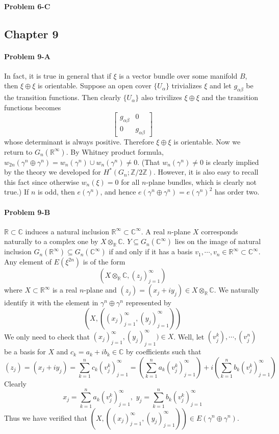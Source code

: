 \documentclass[12pt]{article}
\theoremstyle{plain}
\theoremstyle{definition}
\newcommand{\IC}{\mathbb{C}}
\newcommand{\IR}{\mathbb{R}}
\newcommand{\IZ}{\mathbb{Z}}
\newcommand\tensor{{\otimes}}
\newcommand{\<}{\langle}
\renewcommand{\>}{\rangle}
\begin{document}
\paragraph{Problem 6-C}


\subsection*{Chapter 9}
\paragraph{Problem 9-A}
In fact, it is true in general that if $\xi$ is a vector bundle over some manifold $B$, then $\xi \oplus \xi$ is orientable. Suppose an open cover $\{ U_\alpha \}$ trivializes $\xi$ and let $g_{\alpha \beta}$ be the transition functions. Then clearly $\{U_\alpha\}$ also trivilizes $\xi \oplus \xi$ and the transition functions becomes 
$$ \begin{bmatrix}
g_{\alpha \beta } & 0 \\ 0 & g_{\alpha \beta} 
\end{bmatrix}$$ whose determinant is always positive. Therefore $\xi \oplus \xi$ is orientable. Now we return to $G_n(\IR^\infty)$. By Whitney product formula, $w_{2n}(\gamma^n \oplus \gamma^n) = w_n (\gamma^n) \cup w_n(\gamma^n) \neq 0$. (That $w_n(\gamma^n) \neq 0$ is clearly implied by the theory we developed for $H^*(G_n; \IZ/2\IZ)$. However, it is also easy to recall this fact since otherwise $w_n(\xi) = 0$ for all $n$-plane bundles, which is clearly not true.) If $n$ is odd, then $e(\gamma^n)$, and hence $e(\gamma^n \oplus \gamma^n) = e(\gamma^n)^2$ has order two. 

\paragraph{Problem 9-B} $\IR \subset \IC$ induces a natural inclusion $\IR^\infty \subset \IC^\infty$. A real $n$-plane $X$ corresponds naturally to a complex one by $X \tensor_\IR \IC$. $Y \subseteq G_n(\IC^\infty)$ lies on the image of natural inclusion $G_n(\IR^\infty) \subseteq G_n(\IC^\infty)$ if and only if it has a basis $v_1, \cdots, v_n \in \IR^\infty \subset \IC^\infty$.  Any element of $E(\xi^{2n})$ is of the form 
$$ (X \tensor_\IR \IC, (z_j)_{j = 1}^\infty )$$
where $X \subset \IR^\infty$ is a real $n$-plane and $(z_j) = (x_j + iy_j) \in X \tensor_\IR \IC$. We naturally identify it with the element in $\gamma^n \oplus \gamma^n$ represented by 
$$ (X, ((x_j)_{j = 1}^\infty, (y_j)_{j = 1}^\infty)) $$
We only need to check that $(x_j)_{j = 1}^\infty, (y_j)_{j = 1}^\infty) \in X$. Well, let $(v^k_j), \cdots, (v^n_j)$ be a basis for $X$ and $c_k = a_k + i b_k \in \IC$ by coefficients such that $$(z_j) = (x_j + iy_j) = \sum_{k = 1}^n c_k (v_j^k)_{j = 1}^\infty = (\sum_{k = 1}^n a_k (v_j^k)_{j = 1}^\infty) + i(\sum_{k = 1}^n b_k (v_j^k)_{j = 1}^\infty)$$
Clearly 
$$ x_j = \sum_{k = 1}^n a_k (v_j^k)_{j = 1}^\infty, \, \, y_j = \sum_{k = 1}^n b_k (v_j^k)_{j = 1}^\infty$$
Thus we have verified that $(X, ((x_j)_{j = 1}^\infty, (y_j)_{j = 1}^\infty)) \in E(\gamma^n \oplus \gamma^n)$.
\end{document}
